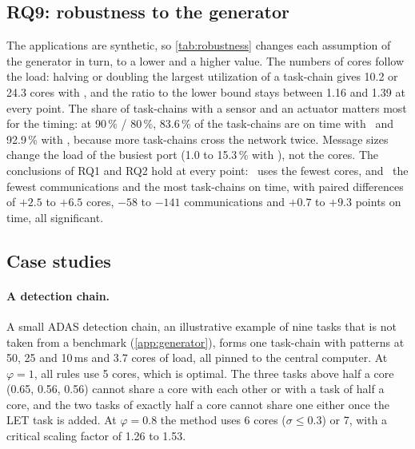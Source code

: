 \subsection{RQ9: robustness to the generator}
\label{sec:rq9}

The applications are synthetic, so \cref{tab:robustness} changes each
assumption of the generator in turn, to a lower and a higher value. The
numbers of cores follow the load: halving or doubling the largest
utilization of a task-chain gives 10.2 or 24.3 cores with \FFDU, and the
ratio to the lower bound stays between 1.16 and 1.39 at every point. The
share of task-chains with a sensor and an actuator matters most for the
timing: at 90\,\% / 80\,\%, 83.6\,\% of the task-chains are on time with
\FFDU\ and 92.9\,\% with \CADU, because more task-chains cross the
network twice. Message sizes change the load of the busiest port (1.0 to
15.3\,\% with \FFDU), not the cores. The conclusions of RQ1 and RQ2 hold at
every point: \FFDU\ uses the fewest cores, and \CADU\ the fewest
communications and the most task-chains on time, with paired differences
of $+2.5$ to $+6.5$ cores, $-58$ to $-141$ communications and $+0.7$ to
$+9.3$ points on time, all significant.



\subsection{Case studies}
\label{sec:cases}

\paragraph{A detection chain.} A small ADAS detection chain, an
illustrative example of nine tasks that is not taken from a benchmark
(\cref{app:generator}), forms one task-chain with patterns at 50, 25 and
10\,ms and 3.7 cores of load, all pinned to the central computer. At $\varphi=1$, all rules use 5
cores, which is optimal. The three tasks above half a core (0.65, 0.56,
0.56) cannot share a core with each other or with a task of half a core,
and the two tasks of exactly half a core cannot share one either once the
LET task is added. At $\varphi=0.8$ the method uses 6 cores
($\sigma\le0.3$) or 7, with a critical scaling factor of 1.26 to 1.53.

